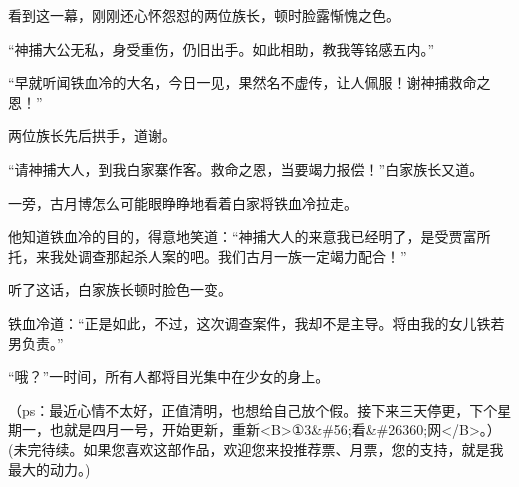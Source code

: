 \begin{this_body}
看到这一幕，刚刚还心怀怨怼的两位族长，顿时脸露惭愧之色。

“神捕大公无私，身受重伤，仍旧出手。如此相助，教我等铭感五内。”

“早就听闻铁血冷的大名，今日一见，果然名不虚传，让人佩服！谢神捕救命之恩！”

两位族长先后拱手，道谢。

“请神捕大人，到我白家寨作客。救命之恩，当要竭力报偿！”白家族长又道。

一旁，古月博怎么可能眼睁睁地看着白家将铁血冷拉走。

他知道铁血冷的目的，得意地笑道：“神捕大人的来意我已经明了，是受贾富所托，来我处调查那起杀人案的吧。我们古月一族一定竭力配合！”

听了这话，白家族长顿时脸色一变。

铁血冷道：“正是如此，不过，这次调查案件，我却不是主导。将由我的女儿铁若男负责。”

“哦？”一时间，所有人都将目光集中在少女的身上。

（ps：最近心情不太好，正值清明，也想给自己放个假。接下来三天停更，下个星期一，也就是四月一号，开始更新，重新<B>①3\&\#56;看\&\#26360;网</B>。）(未完待续。如果您喜欢这部作品，欢迎您来投推荐票、月票，您的支持，就是我最大的动力。)

\end{this_body}

